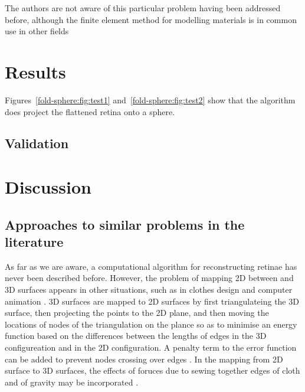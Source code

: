 \documentclass{article}
\begin{document}
 The authors are not aware of this particular problem
having been addressed before, although the  finite element method for
modelling materials is in common use in other fields 


\section{Results}
\label{fold-sphere:sec:results}

Figures~\ref{fold-sphere:fig:test1} and~\ref{fold-sphere:fig:test2}
show that the algorithm does project the flattened retina onto a
sphere.

\subsection{Validation}
\label{fold-sphere:sec:validation}



\section{Discussion}
\label{fold-sphere:sec:discussion}

\subsection{Approaches to similar problems in the literature}
\label{fold-sphere:sec:appr-simil-probl}

As far as we are aware, a computational algorithm for reconstructing
retinae has never been described before. However, the problem of
mapping 2D between and 3D surfaces appears in other situations, such
as in clothes design and computer animation
\citep{FanEtal98spri,MaCaEtal99flat,WangEtal02surf}. 3D surfaces are
mapped to 2D surfaces by first triangulateing the 3D surface, then
projecting the points to the 2D plane, and then moving the locations
of nodes of the triangulation on the plance so as to minimise an
energy function based on the differences between the lengths of edges
in the 3D configureation and in the 2D configuration. A penalty term
to the error function can be added to prevent nodes crossing over
edges \citep{WangEtal02surf}. In the mapping from 2D surface to 3D
surfaces, the effects of foruces due to sewing together edges of cloth
and of gravity may be incorporated \citep{FanEtal98spri}.
\end{document}
